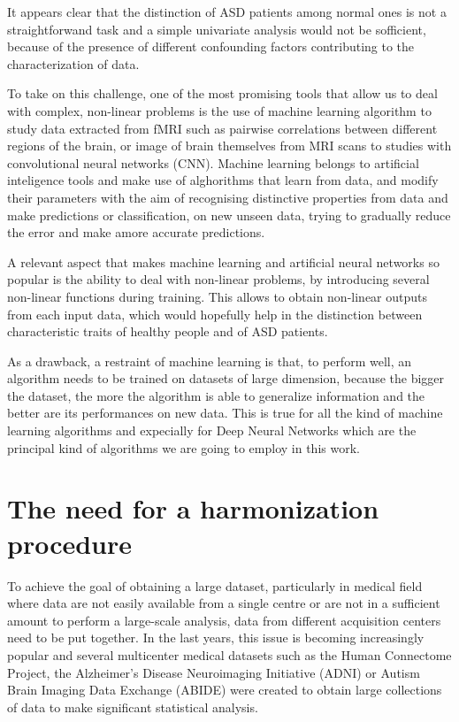 \documentclass[11pt]{report}
\begin{document}
It appears clear that the distinction of ASD patients among normal ones is not a straightforwand task and a simple univariate analysis would not be sofficient, because of the presence of different confounding factors contributing to the characterization of data.

To take on this challenge, one of the most promising tools that allow us to deal with complex, non-linear problems is the use of machine learning algorithm to study data extracted from fMRI such as pairwise correlations between different regions of the brain, or image of brain themselves from MRI scans to studies with convolutional neural networks (CNN).
Machine learning belongs to artificial inteligence tools and make use of alghorithms that learn from data, and modify their parameters with the aim of recognising distinctive properties from data and make predictions or classification, on new unseen data, trying to gradually reduce the error and make amore accurate predictions.

A relevant aspect that makes machine learning and artificial neural networks so popular is the ability to deal with non-linear problems, by introducing several non-linear functions during training.
This allows to obtain non-linear outputs from each input data, which would hopefully help in the distinction between characteristic traits of healthy people and of ASD patients.

As a drawback, a restraint of machine learning is that, to perform well, an algorithm needs to be trained on datasets of large dimension, because the bigger the dataset, the more the algorithm is able to generalize information and the better are its performances on new data.
This is true for all the kind of machine learning algorithms and expecially for Deep Neural Networks which are the principal kind of algorithms we are going to employ in this work.

\section{The need for a harmonization procedure}

To achieve the goal of obtaining a large dataset, particularly in medical field where data are not easily available from a single centre or are not in a sufficient amount to perform a large-scale analysis, data from different acquisition centers need to be put together.
In the last years, this issue is becoming increasingly popular and several multicenter medical datasets such as the Human Connectome Project, the Alzheimer’s Disease Neuroimaging Initiative (ADNI) or Autism Brain Imaging Data Exchange (ABIDE) were created to obtain large collections of data to make significant statistical analysis.
\end{document}
